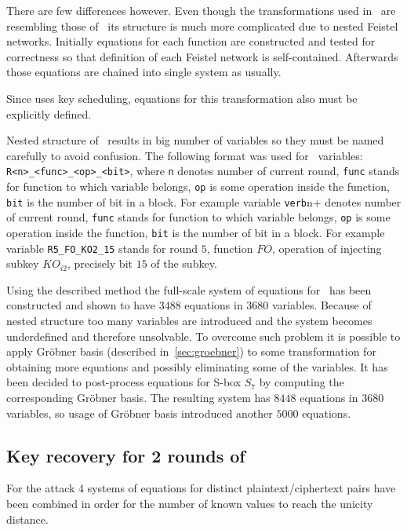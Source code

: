 There are few differences however. Even though the transformations used in
\misty\ are resembling those of \gost\, its structure is much more complicated
due to nested Feistel networks. Initially equations for each function are
constructed and tested for correctness so that definition of each Feistel
network is self-contained. Afterwards those equations are chained into single
system as usually.

Since \misty uses key scheduling, equations for this transformation also must be
explicitly defined.

Nested structure of \misty\ results in big number of variables so they must be
named carefully to avoid confusion. The following format was used for \misty\
variables: \verb+R<n>_<func>_<op>_<bit>+, where \verb+n+ denotes number of
current round, \verb+func+ stands for function to which variable belongs,
\verb+op+ is some operation inside the function, \verb+bit+ is the number of bit
in a block. For example variable \verb+verb+n+ denotes number of
current round, \verb+func+ stands for function to which variable belongs,
\verb+op+ is some operation inside the function, \verb+bit+ is the number of bit
in a block. For example variable \verb+R5_FO_KO2_15+ stands for round $5$,
function $FO$, operation of injecting subkey $KO_{i2}$, precisely bit $15$ of
the subkey.

Using the described method the full-scale system of equations for \misty\
has been constructed and shown to have $3488$ equations in $3680$ variables.
Because of nested structure too many
variables are introduced and the system becomes underdefined and therefore
unsolvable. To overcome such problem it is possible to apply Gr\"obner basis
(described in~\ref{sec:groebner}) to some transformation for obtaining more
equations and possibly eliminating some of the variables. It has been decided to
post-process equations for S-box $S_7$ by computing the corresponding
Gr\"obner basis. The resulting system has $8448$ equations in $3680$ variables,
so usage of Gr\"obner basis introduced another $5000$ equations.


\subsection{Key recovery for 2 rounds of \misty}
\label{sec:misty-key-rec}

For the attack $4$ systems of equations for distinct
\mbox{plaintext/ciphertext} pairs have been combined in order for
the number of known values to reach the unicity distance.

